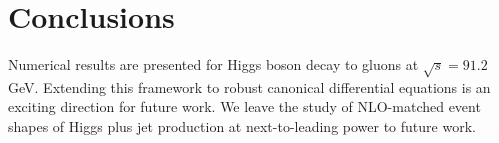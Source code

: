 \section{Conclusions}\label{sec:conclusions}

Numerical results are presented for Higgs boson decay to gluons at
$\sqrt{s} = 91.2$ GeV. Extending this framework to robust canonical
differential equations is an exciting direction for future work. We
leave the study of NLO-matched event shapes of Higgs plus jet production
at next-to-leading power to future work.

